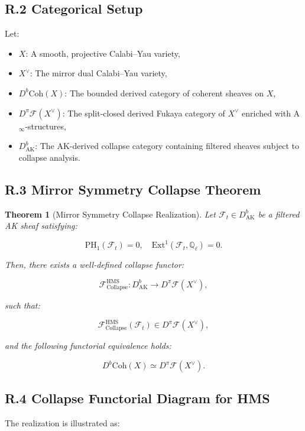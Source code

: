 \documentclass[11pt]{article}
\newtheorem{theorem}{Theorem}[section]
\begin{document}
\subsection*{R.2 Categorical Setup}

Let:
\begin{itemize}
  \item $X$: A smooth, projective Calabi–Yau variety,
  \item $X^\vee$: The mirror dual Calabi–Yau variety,
  \item $D^b\mathrm{Coh}(X)$: The bounded derived category of coherent sheaves on $X$,
  \item $D^\pi\mathcal{F}(X^\vee)$: The split-closed derived Fukaya category of $X^\vee$ enriched with A$_\infty$-structures,
  \item $D^b_{\mathrm{AK}}$: The AK-derived collapse category containing filtered sheaves subject to collapse analysis.
\end{itemize}

\subsection*{R.3 Mirror Symmetry Collapse Theorem}

\begin{theorem}[Mirror Symmetry Collapse Realization]
Let $\mathcal{F}_t \in D^b_{\mathrm{AK}}$ be a filtered AK sheaf satisfying:

\[
\mathrm{PH}_1(\mathcal{F}_t) = 0, \quad \mathrm{Ext}^1(\mathcal{F}_t, \mathbb{Q}_\ell) = 0.
\]

Then, there exists a well-defined collapse functor:

\[
\mathcal{F}_{\mathrm{Collapse}}^{\mathrm{HMS}} : D^b_{\mathrm{AK}} \longrightarrow D^\pi\mathcal{F}(X^\vee),
\]

such that:

\[
\mathcal{F}_{\mathrm{Collapse}}^{\mathrm{HMS}}(\mathcal{F}_t) \in D^\pi\mathcal{F}(X^\vee),
\]

and the following functorial equivalence holds:

\[
D^b\mathrm{Coh}(X) \simeq D^\pi\mathcal{F}(X^\vee).
\]
\end{theorem}

\subsection*{R.4 Collapse Functorial Diagram for HMS}

The realization is illustrated as:
\end{document}
